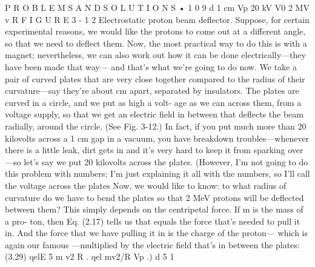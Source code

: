 \documentclass[10pt,oneside]{article}
\begin{document}
P R O B L E M S  A N D  S O L U T I O N S • 1 0 9 d   1 cm Vp   20 kV V0   2 MV v R F I G U R E  3 - 1 2 Electrostatic proton beam deflector. Suppose, for certain experimental reasons, we would like the protons to come out at a different angle, so that we need to deflect them. Now, the most practical way to do this is with a magnet; nevertheless, we can also work out how it can be done electrically---they have been made that way--- and that’s what we’re going to do now. We take a pair of curved plates that are very close together compared to the radius of their curvature---say they’re about cm apart, separated by insulators. The plates are curved in a circle, and we put as high a volt- age as we can across them, from a voltage supply, so that we get an electric field in between that deflects the beam radially, around the circle. (See Fig. 3-12.) In fact, if you put much more than 20 kilovolts across a 1 cm gap in a vacuum, you have breakdown troubles---whenever there is a little leak, dirt gets in and it’s very hard to keep it from sparking over---so let’s say we put 20 kilovolts across the plates. (However, I’m not going to do this problem with numbers; I’m just explaining it all with the numbers, so I’ll call the voltage across the plates Now, we would like to know: to what radius of curvature do we have to bend the plates so that 2 MeV protons will be deflected between them? This simply depends on the centripetal force. If m is the mass of a pro- ton, then Eq. (2.17) tells us that equals the force that’s needed to pull it in. And the force that we have pulling it in is the charge of the proton--- which is again our famous ---multiplied by the electric field that’s in between the plates: (3.29) qelE 5 m v2 R . qel mv2/R Vp .) d 5 1\par
\end{document}
